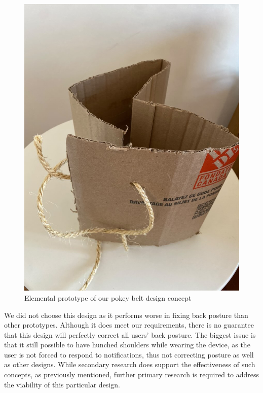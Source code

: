 \documentclass[11pt]{article}
\begin{document}
\begin{figure}[H]
    \centering
        \includegraphics[scale=0.3]{pokeybelt.jpg}
        \caption{Elemental prototype of our pokey belt design concept}
        \label{fig:pokey-belt}

\end{figure}

We did not choose this design as it performs worse in fixing back posture than other prototypes. Although it does meet our requirements, there is no guarantee that this design will perfectly correct all users' back posture. The biggest issue is that it still possible to have hunched shoulders while wearing the device, as the user is not forced to respond to notifications, thus not correcting posture as well as other designs. While secondary research does support the effectiveness of such concepts, as previously mentioned, further primary research is required to address the viability of this particular design.
\end{document}
